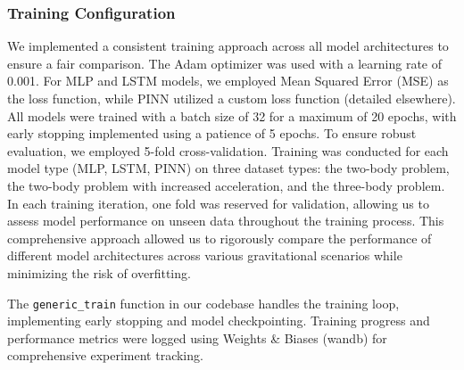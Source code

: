 \documentclass[11pt,a4paper, twocolumn]{article}
\begin{document}
\subsubsection{Training Configuration}
We implemented a consistent training approach across all model architectures to ensure a fair comparison. The Adam optimizer was used with a learning rate of 0.001. For MLP and LSTM models, we employed Mean Squared Error (MSE) as the loss function, while PINN utilized a custom loss function (detailed elsewhere). All models were trained with a batch size of 32 for a maximum of 20 epochs, with early stopping implemented using a patience of 5 epochs. To ensure robust evaluation, we employed 5-fold cross-validation. Training was conducted for each model type (MLP, LSTM, PINN) on three dataset types: the two-body problem, the two-body problem with increased acceleration, and the three-body problem. In each training iteration, one fold was reserved for validation, allowing us to assess model performance on unseen data throughout the training process. This comprehensive approach allowed us to rigorously compare the performance of different model architectures across various gravitational scenarios while minimizing the risk of overfitting.

The \texttt{generic\_train} function in our codebase handles the training loop, implementing early stopping and model checkpointing. Training progress and performance metrics were logged using Weights \& Biases (wandb) for comprehensive experiment tracking.
\end{document}
